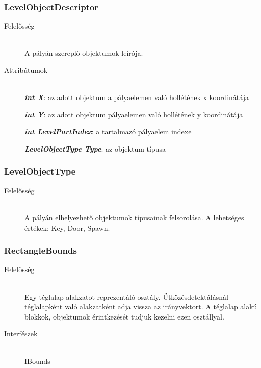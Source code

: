 \subsubsection{LevelObjectDescriptor}
	\begin{description}
		\item[Felelősség] \hfill \\
		A pályán szereplő objektumok leírója.
		
		\item[Attribútumok]\hfill \\
		\textbf{\emph{int X}}: az adott objektum a pályaelemen való hollétének x koordinátája
		
		\textbf{\emph{int Y}}: az adott objektum pályaelemen való hollétének y koordinátája
		
		\textbf{\emph{int LevelPartIndex}}: a tartalmazó pályaelem indexe
		
		\textbf{\emph{LevelObjectType Type}}: az objektum típusa
						
	\end{description}

\subsubsection{LevelObjectType}
	\begin{description}
		\item[Felelősség] \hfill \\
		A pályán elhelyezhető objektumok típusainak felsorolása. A lehetséges értékek: Key, Door, Spawn.
		
	\end{description}

\subsubsection{RectangleBounds}
	\begin{description}
		\item[Felelősség] \hfill \\
		Egy téglalap alakzatot reprezentáló osztály. Ütközésdetektálásnál téglalapként való alakzatként adja vissza az irányvektort. A téglalap alakú blokkok, objektumok érintkezését tudjuk kezelni ezen osztállyal.
				
		\item[Interfészek] \hfill \\
		IBounds
		
	\end{description}

